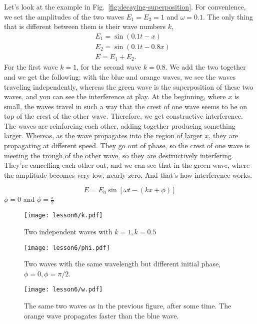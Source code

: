 Let's look at the example in Fig.~\ref{fig:decaying-superposition}. For convenience, we set the amplitudes of the two waves $E_1 = E_2 = 1$ and $\omega = 0.1$. The only thing that is different between them is their wave numbers $k$,
\begin{equation}
\begin{aligned}
&E_{1}=\sin (0.1 t-x) \\
&E_{2}=\sin (0.1 t-0.8 x) \\
&E=E_{1}+E_{2}.
\end{aligned}
\end{equation}
For the first wave $k=1$, for the second wave $k=0.8$. We add the two together and we get the following: with the blue and orange waves, we see the waves traveling independently, whereas the green wave is the superposition of these two waves, and you can see the interference at play. At the beginning, where $x$ is small, the waves travel in such a way that the crest of one wave seems to be on top of the crest of the other wave. Therefore, we get constructive interference. The waves are reinforcing each other, adding together producing something larger. Whereas, as the wave propagates into the region of larger $x$, they are propagating at different speed. They go out of phase, so the crest of one wave is meeting the trough of the other wave, so they are destructively interfering. They're cancelling each other out, and we can see that in the green wave, where the amplitude becomes very low, nearly zero. And that's how interference works.

\begin{equation}
E=E_{0} \sin [\omega t-(k x+\phi)]
\end{equation}
$\phi = 0$ and $\phi = \frac{\pi}{2}$
\fi

\begin{figure}[H]
   \centering
    \texttt{[image: lesson6/k.pdf]}
        \caption{Two independent waves with $k=1, k=0.5$}    
    \label{fig:two-waves}
\end{figure}

\begin{figure}[H]
   \centering
    \texttt{[image: lesson6/phi.pdf]}
        \caption[Same wavelength, different initial phase.]{Two waves with the same wavelength but different initial phase, $\phi = 0, \phi = \pi / 2$.}
    \label{fig:phase-diff-waves}
\end{figure}

\begin{figure}[H]
   \centering
    \texttt{[image: lesson6/w.pdf]}
        \caption[Same wavelength, different initial phase, after a time interval.]{The same two waves as in the previous figure, after some time.  The orange wave propagates faster than the blue wave.}
    \label{fig:propagating-waves}    
\end{figure}

